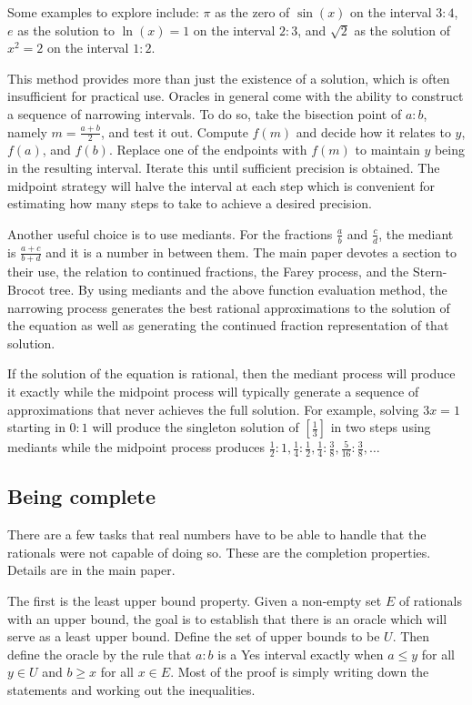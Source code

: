 \documentclass[12pt]{article}
\theoremstyle{remark}
\begin{document}
Some examples to explore include: $\pi$ as the zero of $\sin(x)$ on the interval $3:4$, $e$ as the solution to  $\ln(x)=1$ on the interval $2:3$, and $\sqrt{2}$ as the solution of $x^2 = 2$ on the interval $1:2$. 

This method provides more than just the existence of a solution, which is often insufficient for practical use. Oracles in general come with the ability to construct a sequence of narrowing intervals. To do so, take the bisection point of $a:b$, namely $m =\frac{a+b}{2}$, and test it out. Compute $f(m)$ and decide how it relates to $y$, $f(a)$, and $f(b)$. Replace one of the endpoints with $f(m)$ to maintain $y$ being in the resulting interval. Iterate this until sufficient precision is obtained.  The midpoint strategy will halve the interval at each step which is convenient for estimating how many steps to take to achieve a desired precision. 

Another useful choice is to use mediants. For the fractions $\frac{a}{b}$ and $\frac{c}{d}$, the mediant is $\frac{a+c}{b+d}$ and it is a number in between them. The main paper devotes a section to their use, the relation to continued fractions, the Farey process, and the Stern-Brocot tree. By using mediants and the above function evaluation method, the narrowing process generates the best rational approximations to the solution of the equation as well as generating the continued fraction representation of that solution. 

If the solution of the equation is rational, then the mediant process will produce it exactly while the midpoint process will typically generate a sequence of approximations that never achieves the full solution. For example, solving $3x = 1$ starting in $0:1$ will produce the singleton solution of $[\frac{1}{3}]$ in two steps using mediants while the midpoint process produces $\frac{1}{2}: 1, \frac{1}{4}: \frac{1}{2}, \frac{1}{4}: \frac{3}{8}, \frac{5}{16}: \frac{3}{8}, \ldots$
 

\subsection{Being complete}

There are a few tasks that real numbers have to be able to handle that the rationals were not capable of doing so. These are the completion properties. Details are in the main paper.

The first is the least upper bound property. Given a non-empty set $E$ of rationals with an upper bound, the goal is  to establish that there is an oracle which will serve as a least upper bound. Define the set of upper bounds to be $U$. Then define the oracle by the rule that $a:b$ is a Yes interval exactly when $a\leq y$ for all $y \in U$ and $b\geq x$ for all $x\in E$. Most of the proof is simply writing down the statements and working out the inequalities. 
\end{document}
